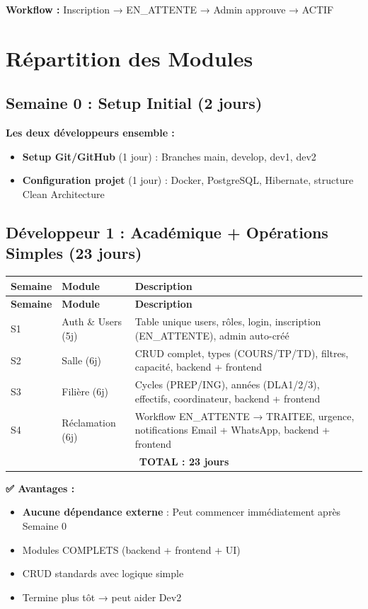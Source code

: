 \documentclass[12pt,a4paper]{article}
\begin{document}
\textbf{Workflow :} Inscription → EN\_ATTENTE → Admin approuve → ACTIF

\newpage

\section{Répartition des Modules}

\subsection{Semaine 0 : Setup Initial (2 jours)}

\textbf{Les deux développeurs ensemble :}

\begin{itemize}
    \item \textbf{Setup Git/GitHub} (1 jour) : Branches main, develop, dev1, dev2
    \item \textbf{Configuration projet} (1 jour) : Docker, PostgreSQL, Hibernate, structure Clean Architecture
\end{itemize}

\subsection{Développeur 1 : Académique + Opérations Simples (23 jours)}

\begin{longtable}{|l|l|p{7cm}|}
\hline
\textbf{Semaine} & \textbf{Module} & \textbf{Description} \\
\hline
\endfirsthead
\hline
\textbf{Semaine} & \textbf{Module} & \textbf{Description} \\
\hline
\endhead
S1 & Auth \& Users (5j) & Table unique users, rôles, login, inscription (EN\_ATTENTE), admin auto-créé \\
\hline
S2 & Salle (6j) & CRUD complet, types (COURS/TP/TD), filtres, capacité, backend + frontend \\
\hline
S3 & Filière (6j) & Cycles (PREP/ING), années (DLA1/2/3), effectifs, coordinateur, backend + frontend \\
\hline
S4 & Réclamation (6j) & Workflow EN\_ATTENTE → TRAITEE, urgence, notifications Email + WhatsApp, backend + frontend \\
\hline
\multicolumn{3}{|c|}{\textbf{TOTAL : 23 jours}} \\
\hline
\end{longtable}

\textbf{✅ Avantages :}
\begin{itemize}
    \item \textbf{Aucune dépendance externe} : Peut commencer immédiatement après Semaine 0
    \item Modules COMPLETS (backend + frontend + UI)
    \item CRUD standards avec logique simple
    \item Termine plus tôt → peut aider Dev2
\end{itemize}
\end{document}
